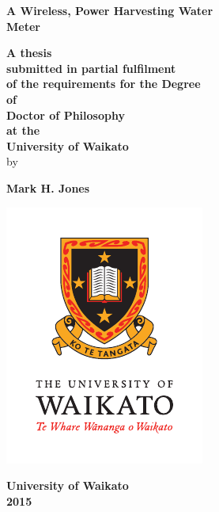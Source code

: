 \begin{titlepage}

\begin{center}
\textbf{\LARGE{}A Wireless, Power Harvesting Water}\\
\textbf{\LARGE{} \medskip{}
Meter}
\par\end{center}{\LARGE \par}

\begin{center}
\vspace{1cm}

\par\end{center}

\begin{center}
\textbf{A thesis}\\
\textbf{ \medskip{}
submitted in partial fulfilment}\\
\textbf{ \medskip{}
of the requirements for the Degree}\\
\textbf{ \medskip{}
of}\\
\textbf{ \medskip{}
Doctor of Philosophy}\\
\textbf{ \medskip{}
at the}\\
\textbf{ \medskip{}
University of Waikato}\\
\textbf{ \medskip{}
} by \vspace{1cm}

\par\end{center}

\begin{center}
\textbf{\large{}Mark H. Jones}
\par\end{center}{\large \par}

\begin{center}
\vspace{40pt}

\par\end{center}

\begin{center}
\includegraphics{Waik-Print-PMS-V}
\par\end{center}

\begin{center}
\textbf{University of Waikato}\\
\textbf{ \medskip{}
2015}
\par\end{center}

\end{titlepage}
